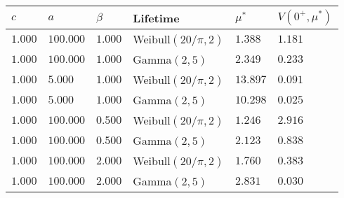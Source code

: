 \documentclass[a4paper]{thesis}
\theoremstyle{definition}
\begin{document}
\begin{appendices}
	\begin{tabularx}{\linewidth}{llllll}\label{table:AgeComputations}
		$c$        & $a$ & $\beta$ & Lifetime & $\mu^*$ & $V(0^+,\mu^*)$        \\
		\hline                       
		$1.000$ & $100.000$ & $1.000$ & Weibull$(20/\pi,2)$ & $1.388$ & $1.181$ \\ 
		$1.000$ & $100.000$ & $1.000$ & Gamma$(2,5)$ & $2.349$ & $0.233$ \\ 
		$1.000$ & $5.000$ & $1.000$ & Weibull$(20/\pi,2)$ & $13.897$ & $0.091$ \\ 
		$1.000$ & $5.000$ & $1.000$ & Gamma$(2,5)$ & $10.298$ & $0.025$ \\ 
		$1.000$ & $100.000$ & $0.500$ & Weibull$(20/\pi,2)$ & $1.246$ & $2.916$ \\ 
		$1.000$ & $100.000$ & $0.500$ & Gamma$(2,5)$ & $2.123$ & $0.838$ \\ 
		$1.000$ & $100.000$ & $2.000$ & Weibull$(20/\pi,2)$ & $1.760$ & $0.383$ \\ 
		$1.000$ & $100.000$ & $2.000$ & Gamma$(2,5)$ & $2.831$ & $0.030$ \\ 
	\end{tabularx}


\end{appendices}
\end{document}
